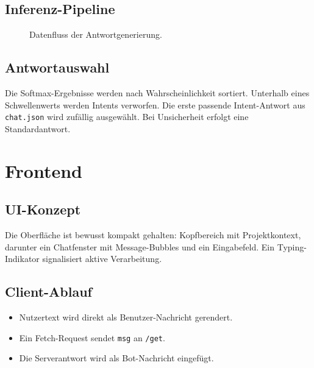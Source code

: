 \documentclass[a4paper,11pt]{article}
\begin{document}
\subsection{Inferenz-Pipeline}
\begin{figure}[H]
\centering
{}
\caption{Datenfluss der Antwortgenerierung.}
\end{figure}

\subsection{Antwortauswahl}
Die Softmax-Ergebnisse werden nach Wahrscheinlichkeit sortiert. Unterhalb eines Schwellenwerts werden Intents verworfen.
Die erste passende Intent-Antwort aus \texttt{chat.json} wird zuf\"allig ausgew\"ahlt. Bei Unsicherheit erfolgt eine Standardantwort.

\section{Frontend}
\subsection{UI-Konzept}
Die Oberfl\"ache ist bewusst kompakt gehalten: Kopfbereich mit Projektkontext, darunter ein Chatfenster mit
Message-Bubbles und ein Eingabefeld. Ein Typing-Indikator signalisiert aktive Verarbeitung.

\subsection{Client-Ablauf}
\begin{itemize}
  \item Nutzertext wird direkt als Benutzer-Nachricht gerendert.
  \item Ein Fetch-Request sendet \texttt{msg} an \texttt{/get}.
  \item Die Serverantwort wird als Bot-Nachricht eingef\"ugt.
\end{itemize}
\end{document}
